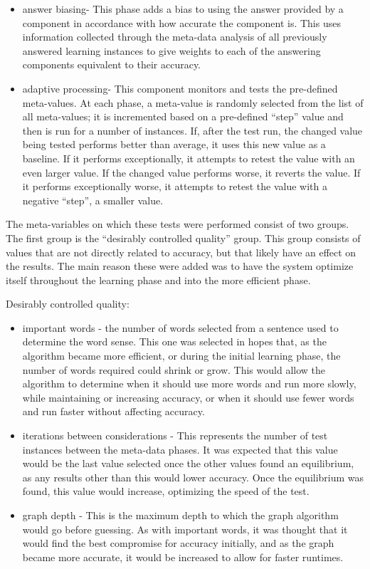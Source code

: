\begin{itemize}
\item answer biasing- This phase adds a bias to using the answer provided by a 
component in accordance with how accurate the component is.  This uses 
information collected through the meta-data analysis of all previously answered 
learning instances to give weights to each of the answering components 
equivalent to their accuracy.     
\item adaptive processing- This component monitors and tests the pre-defined 
meta-values.  At each phase, a meta-value is randomly selected from the list of 
all meta-values; it is incremented based on a pre-defined ``step'' value and 
then is run for a number of instances. If, after the test run, the changed value 
being tested performs better than average, it uses this new value as a baseline. 
If it performs exceptionally, it attempts to retest the value with an even larger 
value.  If the changed value performs worse, it reverts the value. If it performs 
exceptionally worse, it attempts to retest the value with a negative ``step'', a 
smaller value. 
\end{itemize}

The meta-variables on which these tests were performed consist of two groups. The
first group is the ``desirably controlled quality'' group.  This group
consists of values that are not directly related to accuracy, but that likely have an effect
on the results.  The main reason these were added was to have the system
optimize itself throughout the learning phase and into the more efficient phase.

Desirably controlled quality:

\begin{itemize}
\item important words - the number of words selected from a sentence used to 
determine the word sense. This one was selected in hopes that, as the algorithm 
became more efficient, or during the initial learning phase, the number of words 
required could shrink or grow. This would allow the algorithm to determine when 
it should use more words and run more slowly, while maintaining or increasing 
accuracy, or when it should use fewer words and run faster without affecting 
accuracy.     

\item iterations between considerations - This represents the number of test 
instances between the meta-data phases. It was expected that this value would be
 the last value selected once the other values found an equilibrium, as any 
 results other than this would lower accuracy. Once the equilibrium was found, 
 this value would increase, optimizing the speed of the test.     
\item graph depth - This is the maximum depth to which the graph algorithm would go before 
guessing.  As with important words, it was thought that it would find the best 
compromise for accuracy initially, and as the graph became more accurate, it 
would be increased to allow for faster
runtimes.

\end{itemize}

